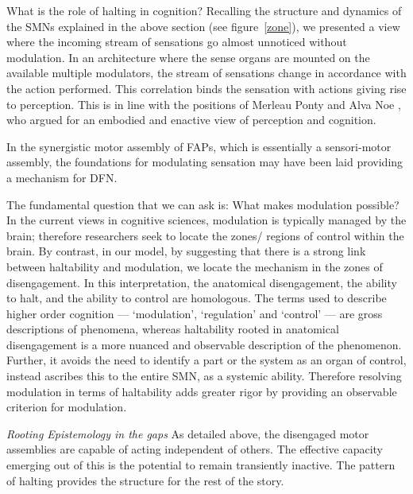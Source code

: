 What is the role of halting in cognition?
Recalling the structure and dynamics of the SMNs explained in the above section (see figure~\ref{zone}), we presented a view where the incoming stream of sensations go almost unnoticed without modulation. In an architecture where the sense organs are mounted on the available multiple modulators, the stream of sensations change in accordance with the action performed. This correlation binds the sensation with actions giving rise to perception. This is in line with the positions of Merleau Ponty \cite{ponty1969phenomenology} and Alva Noe \cite{noe_action_2004}, who argued for an embodied and enactive view of perception and cognition. 

In the synergistic motor assembly of FAPs, which is essentially a sensori-motor assembly, the foundations for modulating sensation may have been laid providing a mechanism for DFN.

The fundamental question that we can ask is: What makes modulation possible? In the current views in cognitive sciences, modulation is typically managed by the brain; therefore researchers seek to locate the zones/ regions of control within the brain. By contrast, in our model, by suggesting that there is a strong link between haltability and modulation, we locate the mechanism in the zones of disengagement. In this interpretation, the anatomical disengagement, the ability to halt, and the ability to control are homologous. The terms used to describe higher order cognition --- `modulation', `regulation' and `control' --- are gross descriptions of phenomena, whereas haltability rooted in anatomical disengagement is a more nuanced and observable description of the phenomenon. Further, it avoids the need to identify a part or the system as an organ of control, instead ascribes this to the entire SMN, as a systemic ability. Therefore resolving modulation in terms of haltability adds greater rigor by providing an observable criterion for modulation.

\emph{Rooting Epistemology in the gaps} As detailed above, the disengaged motor assemblies are capable of acting independent of others. The effective capacity emerging out of this is the potential to remain transiently inactive. The pattern of halting provides the structure for the rest of the story.

